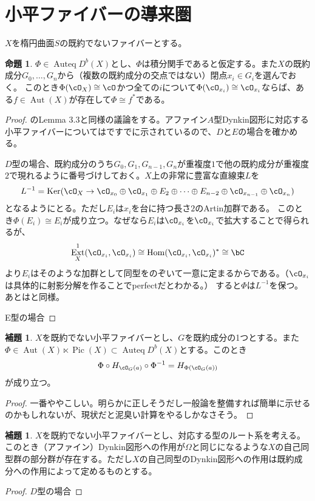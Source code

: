 \documentclass[uplatex, a4paper, dvipdfmx]{jsarticle}
\theoremstyle{definition}
\newtheorem{proposition}[theorem]{命題}
\newtheorem{lemma}[theorem]{補題}
\DeclareMathOperator{\Hom}{\mathrm{Hom}}
\DeclareMathOperator{\Auteq}{\mathrm{Auteq}}
\DeclareMathOperator{\Pic}{\mathrm{Pic}}
\DeclareMathOperator{\Ker}{\mathrm{Ker}}
\DeclareMathOperator{\Aut}{\mathrm{Aut}}
\DeclareMathOperator{\Ext}{\mathrm{Ext}}
\begin{document}
\section{小平ファイバーの導来圏}
$X$を楕円曲面$S$の既約でないファイバーとする。
\begin{proposition}
    $\Phi \in \Auteq D^b(X)$とし、$\Phi$は積分関手であると仮定する。また$X$の既約成分$G_0, \dots, G_n$から（複数の既約成分の交点ではない）閉点$x_i \in G_i$を選んでおく。
    このとき$\Phi(\cO_X) \cong \cO$かつ全ての$i$について$\Phi(\cO_{x_i}) \cong \cO_{x_i}$ならば、ある$f \in \Aut(X)$が存在して$\Phi \cong f^*$である。
\end{proposition}
\begin{proof}
    \cite{MR3182005}のLemma 3.3と同様の議論をする。アファイン$A$型Dynkin図形に対応する小平ファイバーについては\cite{MR3182005}ですでに示されているので、$D$と$E$の場合を確かめる。

    $D$型の場合、既約成分のうち$G_0, G_1, G_{n-1}, G_n$が重複度$1$で他の既約成分が重複度$2$で現れるように番号づけしておく。$X$上の非常に豊富な直線束$L$を
    \begin{equation}
        L^{-1} = \Ker(\cO_X \to \cO_{x_0}\oplus \cO_{x_1} \oplus E_2 \oplus \cdots \oplus E_{n-2}\oplus \cO_{x_{n-1}} \oplus \cO_{x_n})
    \end{equation}
    となるようにとる。ただし$E_i$は$x_i$を台に持つ長さ$2$のArtin加群である。
    このとき$\Phi(E_i) \cong E_i$が成り立つ。なぜなら$E_i$は$\cO_{x_i}$を$\cO_{x_i}$で拡大することで得られるが、
    \begin{equation}
        \Ext_X^1(\cO_{x_i}, \cO_{x_i}) \cong \Hom(\cO_{x_i}, \cO_{x_i})^* \cong \bC
    \end{equation}
    より$E_i$はそのような加群として同型をのぞいて一意に定まるからである。（$\cO_{x_i}$は具体的に射影分解を作ることでperfectだとわかる。）
    すると$\Phi$は$L^{-1}$を保つ。あとは\cite{MR3182005}と同様。

    E型の場合
\end{proof}
\begin{lemma}
    $X$を既約でない小平ファイバーとし、$G$を既約成分の1つとする。また$\Phi \in \Aut(X) \ltimes \Pic(X) \subset \Auteq D^b(X)$とする。このとき
    \begin{equation}
        \Phi \circ H_{\cO_G(a)}\circ \Phi^{-1} = H_{\Phi(\cO_G(a))}
    \end{equation}
    が成り立つ。
\end{lemma}
\begin{proof}
    一番ややこしい。明らかに正しそうだし一般論を整備すれば簡単に示せるのかもしれないが、現状だと泥臭い計算をやるしかなさそう。
\end{proof}
\begin{lemma}\label{lem:omega_in_automorphisms}
    $X$を既約でない小平ファイバーとし、対応する型のルート系を考える。このとき（アファイン）Dynkin図形への作用が$\Omega$と同じになるような$X$の自己同型群の部分群が存在する。ただし$X$の自己同型のDynkin図形への作用は既約成分への作用によって定めるものとする。
\end{lemma}
\begin{proof}
    $D$型の場合
\end{proof}
\end{document}
